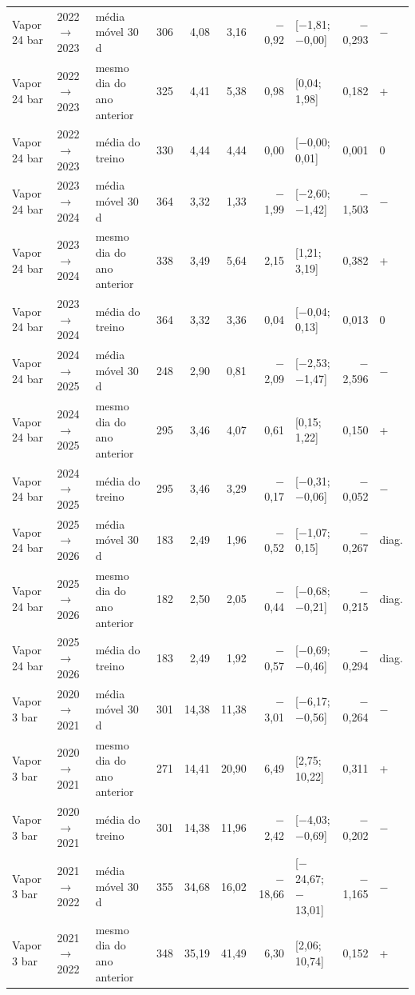 {\begin{xltabular}{\linewidth}{@{}llp{2.4cm}rrrrlrl@{}}
Vapor 24 bar & 2022$\to$2023 & média móvel 30 d & 306 & 4,08 & 3,16 & $-$0,92 & [$-$1,81; $-$0,00] & $-$0,293 & $-$ \\
Vapor 24 bar & 2022$\to$2023 & mesmo dia do ano anterior & 325 & 4,41 & 5,38 & 0,98 & [0,04; 1,98] & 0,182 & + \\
Vapor 24 bar & 2022$\to$2023 & média do treino & 330 & 4,44 & 4,44 & 0,00 & [$-$0,00; 0,01] & 0,001 & 0 \\
Vapor 24 bar & 2023$\to$2024 & média móvel 30 d & 364 & 3,32 & 1,33 & $-$1,99 & [$-$2,60; $-$1,42] & $-$1,503 & $-$ \\
Vapor 24 bar & 2023$\to$2024 & mesmo dia do ano anterior & 338 & 3,49 & 5,64 & 2,15 & [1,21; 3,19] & 0,382 & + \\
Vapor 24 bar & 2023$\to$2024 & média do treino & 364 & 3,32 & 3,36 & 0,04 & [$-$0,04; 0,13] & 0,013 & 0 \\
Vapor 24 bar & 2024$\to$2025 & média móvel 30 d & 248 & 2,90 & 0,81 & $-$2,09 & [$-$2,53; $-$1,47] & $-$2,596 & $-$ \\
Vapor 24 bar & 2024$\to$2025 & mesmo dia do ano anterior & 295 & 3,46 & 4,07 & 0,61 & [0,15; 1,22] & 0,150 & + \\
Vapor 24 bar & 2024$\to$2025 & média do treino & 295 & 3,46 & 3,29 & $-$0,17 & [$-$0,31; $-$0,06] & $-$0,052 & $-$ \\
Vapor 24 bar & 2025$\to$2026 & média móvel 30 d & 183 & 2,49 & 1,96 & $-$0,52 & [$-$1,07; 0,15] & $-$0,267 & diag. \\
Vapor 24 bar & 2025$\to$2026 & mesmo dia do ano anterior & 182 & 2,50 & 2,05 & $-$0,44 & [$-$0,68; $-$0,21] & $-$0,215 & diag. \\
Vapor 24 bar & 2025$\to$2026 & média do treino & 183 & 2,49 & 1,92 & $-$0,57 & [$-$0,69; $-$0,46] & $-$0,294 & diag. \\
Vapor 3 bar & 2020$\to$2021 & média móvel 30 d & 301 & 14,38 & 11,38 & $-$3,01 & [$-$6,17; $-$0,56] & $-$0,264 & $-$ \\
Vapor 3 bar & 2020$\to$2021 & mesmo dia do ano anterior & 271 & 14,41 & 20,90 & 6,49 & [2,75; 10,22] & 0,311 & + \\
Vapor 3 bar & 2020$\to$2021 & média do treino & 301 & 14,38 & 11,96 & $-$2,42 & [$-$4,03; $-$0,69] & $-$0,202 & $-$ \\
Vapor 3 bar & 2021$\to$2022 & média móvel 30 d & 355 & 34,68 & 16,02 & $-$18,66 & [$-$24,67; $-$13,01] & $-$1,165 & $-$ \\
Vapor 3 bar & 2021$\to$2022 & mesmo dia do ano anterior & 348 & 35,19 & 41,49 & 6,30 & [2,06; 10,74] & 0,152 & + \\

\end{xltabular}}
